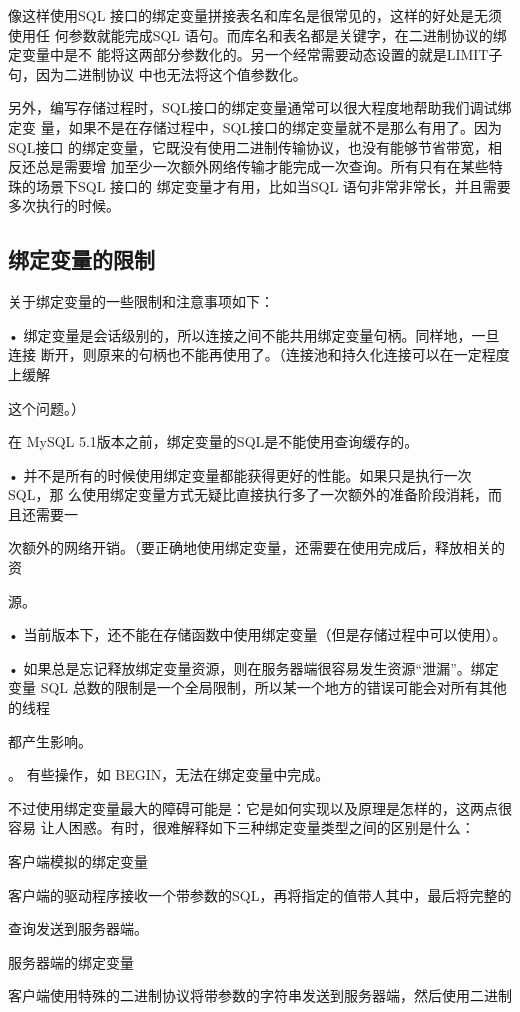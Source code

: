 像这样使用SQL 接口的绑定变量拼接表名和库名是很常见的，这样的好处是无须使用任
何参数就能完成SQL 语句。而库名和表名都是关键字，在二进制协议的绑定变量中是不
能将这两部分参数化的。另一个经常需要动态设置的就是LIMIT子句，因为二进制协议
中也无法将这个值参数化。

另外，编写存储过程时，SQL接口的绑定变量通常可以很大程度地帮助我们调试绑定变
量，如果不是在存储过程中，SQL接口的绑定变量就不是那么有用了。因为SQL接口
的绑定变量，它既没有使用二进制传输协议，也没有能够节省带宽，相反还总是需要增
加至少一次额外网络传输才能完成一次查询。所有只有在某些特珠的场景下SQL 接口的
绑定变量才有用，比如当SQL 语句非常非常长，并且需要多次执行的时候。

\subsection{绑定变量的限制}
关于绑定变量的一些限制和注意事项如下：

• 绑定变量是会话级别的，所以连接之间不能共用绑定变量句柄。同样地，一旦连接
断开，则原来的句柄也不能再使用了。（连接池和持久化连接可以在一定程度上缓解

这个问题。）

在 MySQL 5.1版本之前，绑定变量的SQL是不能使用查询缓存的。

• 并不是所有的时候使用绑定变量都能获得更好的性能。如果只是执行一次SQL，那
么使用绑定变量方式无疑比直接执行多了一次额外的准备阶段消耗，而且还需要一

次额外的网络开销。（要正确地使用绑定变量，还需要在使用完成后，释放相关的资

源。

• 当前版本下，还不能在存储函数中使用绑定变量（但是存储过程中可以使用）。

• 如果总是忘记释放绑定变量资源，则在服务器端很容易发生资源“泄漏”。绑定变量
SQL 总数的限制是一个全局限制，所以某一个地方的错误可能会对所有其他的线程

都产生影响。

。 有些操作，如 BEGIN，无法在绑定变量中完成。

不过使用绑定变量最大的障碍可能是：它是如何实现以及原理是怎样的，这两点很容易
让人困惑。有时，很难解释如下三种绑定变量类型之间的区别是什么：

客户端模拟的绑定变量

客户端的驱动程序接收一个带参数的SQL，再将指定的值带人其中，最后将完整的

查询发送到服务器端。

服务器端的绑定变量

客户端使用特殊的二进制协议将带参数的字符串发送到服务器端，然后使用二进制

